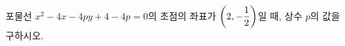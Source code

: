 포물선 $x^2-4x-4py+4-4p=0$의 초점의 좌표가 $\left(2{,}\mkern3mu\mathopen{}-\dfrac{1}{2}\right)$일 때, 상수 $p$의 값을 구하시오.
